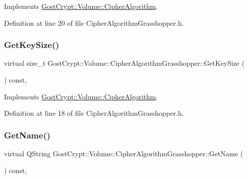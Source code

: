 Implements \hyperlink{class_gost_crypt_1_1_volume_1_1_cipher_algorithm_a01b18f6950161fa518115bf08db3a997}{Gost\+Crypt\+::\+Volume\+::\+Cipher\+Algorithm}.



Definition at line 20 of file Cipher\+Algorithm\+Grasshopper.\+h.

\mbox{\label{class_gost_crypt_1_1_volume_1_1_cipher_algorithm_grasshopper_a8dc485167b00f29037cd9b68e3770e0e}} 
\subsubsection{\texorpdfstring{Get\+Key\+Size()}{GetKeySize()}}
{\footnotesize\ttfamily virtual size\+\_\+t Gost\+Crypt\+::\+Volume\+::\+Cipher\+Algorithm\+Grasshopper\+::\+Get\+Key\+Size (\begin{DoxyParamCaption}{ }\end{DoxyParamCaption}) const\hspace{0.3cm}{\ttfamily [inline]}, {\ttfamily [virtual]}}



Implements \hyperlink{class_gost_crypt_1_1_volume_1_1_cipher_algorithm_aaf60dff95401e6f017ce0c2584f0e593}{Gost\+Crypt\+::\+Volume\+::\+Cipher\+Algorithm}.



Definition at line 18 of file Cipher\+Algorithm\+Grasshopper.\+h.

\mbox{\label{class_gost_crypt_1_1_volume_1_1_cipher_algorithm_grasshopper_a9632d2781e6943683b02ff69766bef0e}} 
\subsubsection{\texorpdfstring{Get\+Name()}{GetName()}}
{\footnotesize\ttfamily virtual Q\+String Gost\+Crypt\+::\+Volume\+::\+Cipher\+Algorithm\+Grasshopper\+::\+Get\+Name (\begin{DoxyParamCaption}{ }\end{DoxyParamCaption}) const\hspace{0.3cm}{\ttfamily [inline]}, {\ttfamily [virtual]}}



